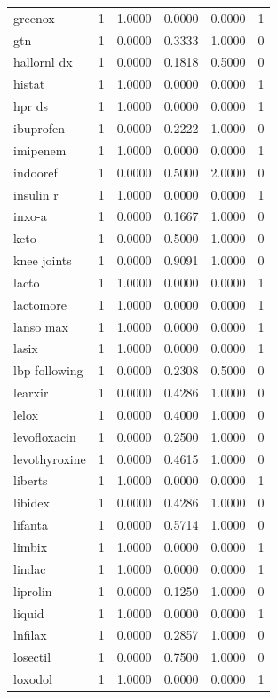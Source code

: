 \begin{longtable}{p{3.0cm}rrrrr}
greenox & 1 & 1.0000 & 0.0000 & 0.0000 & 1 \\
gtn & 1 & 0.0000 & 0.3333 & 1.0000 & 0 \\
hallornl dx & 1 & 0.0000 & 0.1818 & 0.5000 & 0 \\
histat & 1 & 1.0000 & 0.0000 & 0.0000 & 1 \\
hpr ds & 1 & 1.0000 & 0.0000 & 0.0000 & 1 \\
ibuprofen & 1 & 0.0000 & 0.2222 & 1.0000 & 0 \\
imipenem & 1 & 1.0000 & 0.0000 & 0.0000 & 1 \\
indooref & 1 & 0.0000 & 0.5000 & 2.0000 & 0 \\
insulin r & 1 & 1.0000 & 0.0000 & 0.0000 & 1 \\
inxo-a & 1 & 0.0000 & 0.1667 & 1.0000 & 0 \\
keto & 1 & 0.0000 & 0.5000 & 1.0000 & 0 \\
knee joints & 1 & 0.0000 & 0.9091 & 1.0000 & 0 \\
lacto & 1 & 1.0000 & 0.0000 & 0.0000 & 1 \\
lactomore & 1 & 1.0000 & 0.0000 & 0.0000 & 1 \\
lanso max & 1 & 1.0000 & 0.0000 & 0.0000 & 1 \\
lasix & 1 & 1.0000 & 0.0000 & 0.0000 & 1 \\
lbp following & 1 & 0.0000 & 0.2308 & 0.5000 & 0 \\
learxir & 1 & 0.0000 & 0.4286 & 1.0000 & 0 \\
lelox & 1 & 0.0000 & 0.4000 & 1.0000 & 0 \\
levofloxacin & 1 & 0.0000 & 0.2500 & 1.0000 & 0 \\
levothyroxine & 1 & 0.0000 & 0.4615 & 1.0000 & 0 \\
liberts & 1 & 1.0000 & 0.0000 & 0.0000 & 1 \\
libidex & 1 & 0.0000 & 0.4286 & 1.0000 & 0 \\
lifanta & 1 & 0.0000 & 0.5714 & 1.0000 & 0 \\
limbix & 1 & 1.0000 & 0.0000 & 0.0000 & 1 \\
lindac & 1 & 1.0000 & 0.0000 & 0.0000 & 1 \\
liprolin & 1 & 0.0000 & 0.1250 & 1.0000 & 0 \\
liquid & 1 & 1.0000 & 0.0000 & 0.0000 & 1 \\
lnfilax & 1 & 0.0000 & 0.2857 & 1.0000 & 0 \\
losectil & 1 & 0.0000 & 0.7500 & 1.0000 & 0 \\
loxodol & 1 & 1.0000 & 0.0000 & 0.0000 & 1 \\

\end{longtable}
